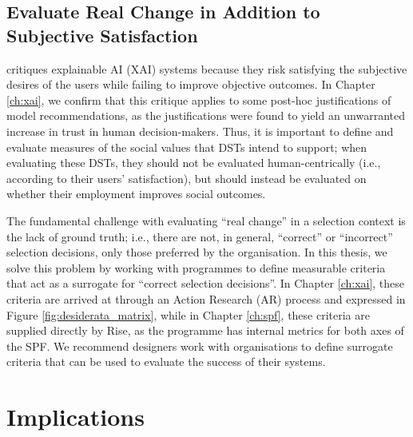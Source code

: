 \subsection{Evaluate Real Change in Addition to Subjective Satisfaction}\label{ssec:real_change}
\textcite{Lipton} critiques explainable AI (XAI) systems because they risk satisfying the subjective desires of the users while failing to improve objective outcomes. In Chapter \ref{ch:xai}, we confirm that this critique applies to some post-hoc justifications of model recommendations, as the justifications were found to yield an unwarranted increase in trust in human decision-makers. Thus, it is important to define and evaluate measures of the social values that DSTs intend to support; when evaluating these DSTs, they should not be evaluated human-centrically (i.e., according to their users' satisfaction), but should instead be evaluated on whether their employment improves social outcomes.

The fundamental challenge with evaluating ``real change'' in a selection context is the lack of ground truth; i.e., there are not, in general, ``correct'' or ``incorrect'' selection decisions, only those preferred by the organisation. In this thesis, we solve this problem by working with programmes to define measurable criteria that act as a surrogate for ``correct selection decisions''. In Chapter \ref{ch:xai}, these criteria are arrived at through an Action Research (AR) process and expressed in Figure \ref{fig:desiderata_matrix}, while in Chapter \ref{ch:spf}, these criteria are supplied directly by Rise, as the programme has internal metrics for both axes of the SPF. We recommend designers work with organisations to define surrogate criteria that can be used to evaluate the success of their systems.

\section{Implications}
